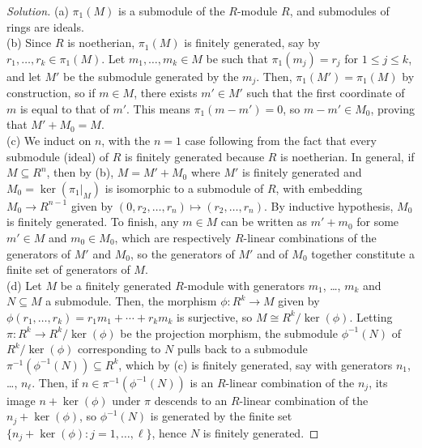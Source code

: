\documentclass[10pt]{article}
\providecommand{\inv}{^{-1}}
\newenvironment{soln}{\begin{proof}[Solution]}{\end{proof}}
\begin{document}
\begin{soln}
    (a) $\pi_1(M)$ is a submodule of the $R$-module $R$,
    and submodules of rings are ideals.
    \\

    (b) Since $R$ is noetherian, $\pi_1(M)$ is finitely generated,
    say by $r_1,\dots,r_k\in\pi_1(M)$.
    Let $m_1,\dots,m_k\in M$ be such that $\pi_1(m_j) = r_j$
    for $1\le j\le k$, and let $M'$ be the submodule generated by the $m_j$.
    Then, $\pi_1(M') = \pi_1(M)$ by construction,
    so if $m\in M$, there exists $m'\in M'$ such that
    the first coordinate of $m$ is equal to that of $m'$.
    This means $\pi_1(m-m') = 0$, so $m-m'\in M_0$,
    proving that $M' + M_0 = M$.
    \\

    (c) We induct on $n$, with the $n=1$ case following from
    the fact that every submodule (ideal) of $R$ is finitely generated
    because $R$ is noetherian. In general, if $M\subseteq R^n$,
    then by (b), $M = M' + M_0$ where $M'$ is finitely generated
    and $M_0 = \ker(\pi_1|_{M})$ is isomorphic
    to a submodule of $R$, with embedding $M_0\to R^{n-1}$ given by
    $(0, r_2,\dots,r_n)\mapsto(r_2,\dots,r_n)$.
    By inductive hypothesis, $M_0$ is finitely generated.
    To finish, any $m\in M$ can be written as $m' + m_0$
    for some $m'\in M$ and $m_0\in M_0$, which are respectively
    $R$-linear combinations of the generators of $M'$ and $M_0$,
    so the generators of $M'$ and of $M_0$ together
    constitute a finite set of generators of $M$.
    \\

    (d) Let $M$ be a finitely generated $R$-module
    with generators $m_1$, \dots, $m_k$ and $N\subseteq M$ a submodule.
    Then, the morphism $\phi\colon R^k\to M$ given by
    $\phi(r_1,\dots,r_k) = r_1m_1 + \cdots + r_km_k$
    is surjective, so $M\cong R^k/\ker(\phi)$.
    Letting $\pi\colon R^k\to R^k/\ker(\phi)$ be the projection morphism,
    the submodule $\phi\inv(N)$ of $R^k/\ker(\phi)$ corresponding to $N$
    pulls back to a submodule $\pi\inv(\phi\inv(N))\subseteq R^k$,
    which by (c) is finitely generated, say with generators $n_1$, \dots, $n_\ell$.
    Then, if $n\in\pi\inv(\phi\inv(N))$ is an $R$-linear combination
    of the $n_j$, its image $n + \ker(\phi)$ under $\pi$
    descends to an $R$-linear combination of the $n_j + \ker(\phi)$,
    so $\phi\inv(N)$ is generated by the finite set
    $\{n_j + \ker(\phi) : j=1,\dots,\ell\}$, hence $N$ is finitely generated.
\end{soln}
\end{document}
